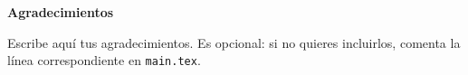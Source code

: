 \cleardoublepage
\thispagestyle{empty}
\vspace*{\fill}
\begin{center}
  {\Large\bfseries Agradecimientos}
\end{center}
\vspace{2em}

\noindent Escribe aquí tus agradecimientos. Es opcional: si no quieres
incluirlos, comenta la línea correspondiente en \texttt{main.tex}.

\vspace*{\fill}
